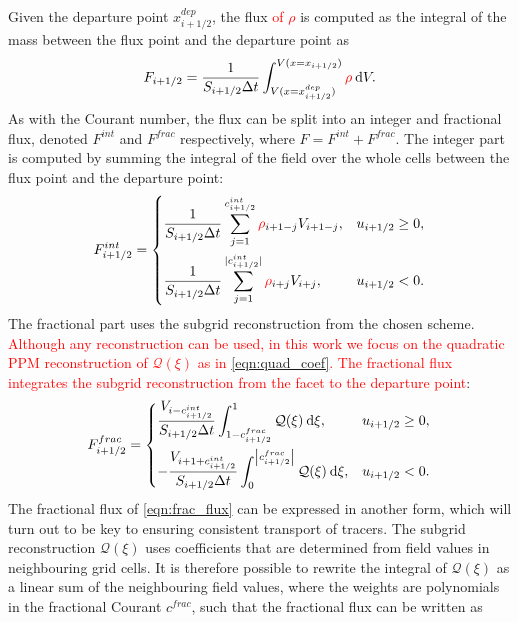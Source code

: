 \documentclass{ametsocV6.1}
\newcommand{\dx}[1]{\hspace{0.75mm}\mathrm{d}{#1}}
\newcommand{\change}[1]{\textcolor{red}{#1}}
\begin{document}
Given the departure point $x^{dep}_{i+1/2}$, the flux \change{of $\rho$} is computed as the integral of the mass between the flux point and the departure point as
\begin{equation}
F_{i+1/2} = 
\frac{1}{S_{i+1/2}\Delta{t}} \int^{V(x=x_{i+1/2})}_{V(x=x^{dep}_{i+1/2})} \change{\rho} \dx{V}.  
\end{equation}
As with the Courant number, the flux can be split into an integer and fractional flux, denoted $F^{int}$ and $F^{frac}$ respectively, where $F = F^{int} + F^{frac}$.
The integer part is computed by summing the integral of the field over the whole cells between the flux point and the departure point:
\begin{equation}
    F^{int}_{i+1/2} = 
    \begin{dcases}
        \frac{1}{S_{i+1/2}\Delta{t}}\sum_{j=1}^{c_{i+1/2}^{int}} \change{\rho}_{i+1-j} V_{i+1-j}, & u_{i+1/2} \geq 0, \\
        \frac{1}{S_{i+1/2}\Delta{t}}\sum_{j=1}^{|c_{i+1/2}^{int}|} \change{\rho}_{i+j} V_{i+j}, & u_{i+1/2} < 0.
    \end{dcases}
\end{equation}
The fractional part uses the subgrid reconstruction from the chosen scheme.
\change{Although any reconstruction can be used, in this work we focus on the quadratic PPM reconstruction of $\mathcal{Q}(\xi)$ as in \eqref{eqn:quad_coef}. The fractional flux integrates the subgrid reconstruction from the facet to the departure point}:
\begin{equation} \label{eqn:frac_flux}
    F^{frac}_{i+1/2} = 
    \begin{dcases}
        \frac{V_{i-c^{int}_{i+1/2}}}{S_{i+1/2}\Delta t} \int^{1}_{1-c_{i+1/2}^{frac}} \mathcal{Q}(\xi) \dx{\xi}, & u_{i+1/2} \ge 0, \\
        -\frac{V_{i+1+c^{int}_{i+1/2}}}{S_{i+1/2}\Delta t} \int^{\left| c_{i+1/2}^{frac}\right|}_{0} \mathcal{Q}(\xi) \dx{\xi}, & u_{i+1/2} < 0.  
    \end{dcases}
\end{equation}
The fractional flux of \eqref{eqn:frac_flux} can be expressed in another form, which will turn out to be key to ensuring consistent transport of tracers. 
The subgrid reconstruction $\mathcal{Q}(\xi)$ uses coefficients that are determined from field values in neighbouring grid cells.
It is therefore possible to rewrite the integral of $\mathcal{Q}(\xi)$ as a linear sum of the neighbouring field values, where the weights are polynomials in the fractional Courant $c^{frac}$, such that the fractional flux can be written as
\end{document}

